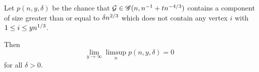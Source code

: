 \begin{lemma} \label{L: Lemma 9}
	Let $p(n, y, \delta)$ be the chance that $\mathcal{G} \in \mathscr{G}(n, n^{-1} + tn^{-4/3})$
	contains a component of size greater than or equal to $\delta n^{2 / 3}$
	which does not contain any vertex $i$ with $1 \leq i \leq yn^{1 / 3}$.
	
	Then
	\begin{equation}
	\lim_{y \rightarrow \infty} \limsup_n p(n, y, \delta) = 0 \enspace
	\end{equation}
	for all $\delta > 0$.
\end{lemma}

